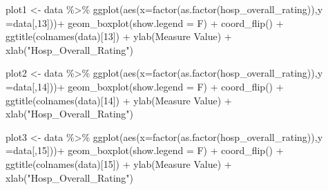 \documentclass[
]{article}
\newenvironment{Shaded}{\begin{snugshade}}{\end{snugshade}}
\newcommand{\AttributeTok}[1]{\textcolor[rgb]{0.77,0.63,0.00}{#1}}
\newcommand{\DecValTok}[1]{\textcolor[rgb]{0.00,0.00,0.81}{#1}}
\newcommand{\FunctionTok}[1]{\textcolor[rgb]{0.00,0.00,0.00}{#1}}
\newcommand{\NormalTok}[1]{#1}
\newcommand{\OtherTok}[1]{\textcolor[rgb]{0.56,0.35,0.01}{#1}}
\newcommand{\SpecialCharTok}[1]{\textcolor[rgb]{0.00,0.00,0.00}{#1}}
\newcommand{\StringTok}[1]{\textcolor[rgb]{0.31,0.60,0.02}{#1}}
\begin{document}
\begin{Shaded}
\begin{Highlighting}[]
\NormalTok{plot1 }\OtherTok{\textless{}{-}}\NormalTok{ data }\SpecialCharTok{\%\textgreater{}\%} \FunctionTok{ggplot}\NormalTok{(}\FunctionTok{aes}\NormalTok{(}\AttributeTok{x=}\FunctionTok{factor}\NormalTok{(}\FunctionTok{as.factor}\NormalTok{(hosp\_overall\_rating)),}\AttributeTok{y =}\NormalTok{data[,}\DecValTok{13}\NormalTok{]))}\SpecialCharTok{+}
  \FunctionTok{geom\_boxplot}\NormalTok{(}\AttributeTok{show.legend =}\NormalTok{ F) }\SpecialCharTok{+}
  \FunctionTok{coord\_flip}\NormalTok{() }\SpecialCharTok{+}
  \FunctionTok{ggtitle}\NormalTok{(}\FunctionTok{colnames}\NormalTok{(data)[}\DecValTok{13}\NormalTok{]) }\SpecialCharTok{+} 
  \FunctionTok{ylab}\NormalTok{(}\StringTok{\textquotesingle{}Measure Value\textquotesingle{}}\NormalTok{) }\SpecialCharTok{+} \FunctionTok{xlab}\NormalTok{(}\StringTok{"Hosp\_Overall\_Rating"}\NormalTok{)}


\NormalTok{plot2 }\OtherTok{\textless{}{-}}\NormalTok{ data }\SpecialCharTok{\%\textgreater{}\%} \FunctionTok{ggplot}\NormalTok{(}\FunctionTok{aes}\NormalTok{(}\AttributeTok{x=}\FunctionTok{factor}\NormalTok{(}\FunctionTok{as.factor}\NormalTok{(hosp\_overall\_rating)),}\AttributeTok{y =}\NormalTok{data[,}\DecValTok{14}\NormalTok{]))}\SpecialCharTok{+}
  \FunctionTok{geom\_boxplot}\NormalTok{(}\AttributeTok{show.legend =}\NormalTok{ F) }\SpecialCharTok{+}
  \FunctionTok{coord\_flip}\NormalTok{() }\SpecialCharTok{+}
  \FunctionTok{ggtitle}\NormalTok{(}\FunctionTok{colnames}\NormalTok{(data)[}\DecValTok{14}\NormalTok{]) }\SpecialCharTok{+} 
  \FunctionTok{ylab}\NormalTok{(}\StringTok{\textquotesingle{}Measure Value\textquotesingle{}}\NormalTok{) }\SpecialCharTok{+} \FunctionTok{xlab}\NormalTok{(}\StringTok{"Hosp\_Overall\_Rating"}\NormalTok{)}

\NormalTok{plot3 }\OtherTok{\textless{}{-}}\NormalTok{ data }\SpecialCharTok{\%\textgreater{}\%} \FunctionTok{ggplot}\NormalTok{(}\FunctionTok{aes}\NormalTok{(}\AttributeTok{x=}\FunctionTok{factor}\NormalTok{(}\FunctionTok{as.factor}\NormalTok{(hosp\_overall\_rating)),}\AttributeTok{y =}\NormalTok{data[,}\DecValTok{15}\NormalTok{]))}\SpecialCharTok{+}
  \FunctionTok{geom\_boxplot}\NormalTok{(}\AttributeTok{show.legend =}\NormalTok{ F) }\SpecialCharTok{+}
  \FunctionTok{coord\_flip}\NormalTok{() }\SpecialCharTok{+}
  \FunctionTok{ggtitle}\NormalTok{(}\FunctionTok{colnames}\NormalTok{(data)[}\DecValTok{15}\NormalTok{]) }\SpecialCharTok{+} 
  \FunctionTok{ylab}\NormalTok{(}\StringTok{\textquotesingle{}Measure Value\textquotesingle{}}\NormalTok{) }\SpecialCharTok{+} \FunctionTok{xlab}\NormalTok{(}\StringTok{"Hosp\_Overall\_Rating"}\NormalTok{)}



\end{Highlighting}
\end{Shaded}
\end{document}
